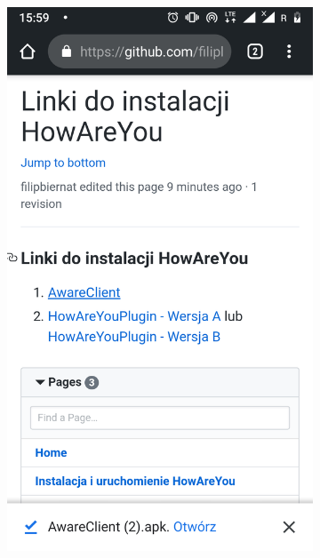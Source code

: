 \begin{enumerate}
	\begin{figure}[H]
		\centering
		\begin{subfigure}{0.35\textwidth}
			\centering
			\includegraphics[scale=0.13]{dodatekA/2_3.png}
			\subcaption{\label{subfigure_a}}
		\end{subfigure}
		\begin{subfigure}{0.35\textwidth}
			\centering

\end{subfigure}
\end{figure}
\end{enumerate}
